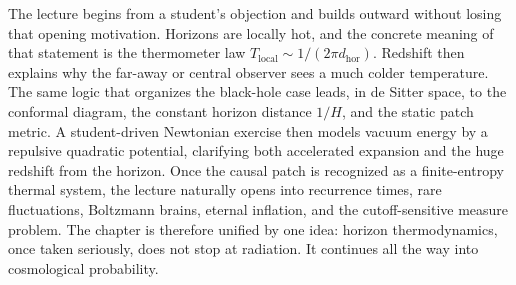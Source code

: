 The lecture begins from a student's objection and builds outward without losing that opening motivation. Horizons are locally hot, and the concrete meaning of that statement is the thermometer law \(T_{\text{local}}\sim 1/(2\pi d_{\text{hor}})\). Redshift then explains why the far-away or central observer sees a much colder temperature. The same logic that organizes the black-hole case leads, in de Sitter space, to the conformal diagram, the constant horizon distance \(1/H\), and the static patch metric. A student-driven Newtonian exercise then models vacuum energy by a repulsive quadratic potential, clarifying both accelerated expansion and the huge redshift from the horizon. Once the causal patch is recognized as a finite-entropy thermal system, the lecture naturally opens into recurrence times, rare fluctuations, Boltzmann brains, eternal inflation, and the cutoff-sensitive measure problem. The chapter is therefore unified by one idea: horizon thermodynamics, once taken seriously, does not stop at radiation. It continues all the way into cosmological probability.